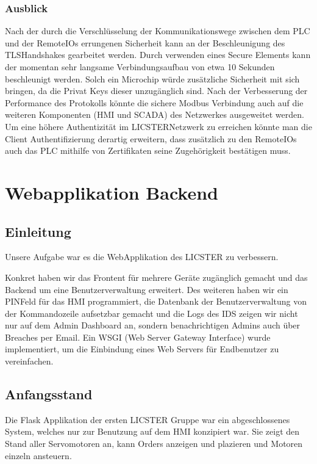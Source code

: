 \documentclass[letterpaper,10pt,ngerman]{sphinxmanual}
\begin{document}
\subsubsection{Ausblick}
\label{\detokenize{seccom:ausblick}}
Nach der durch die Verschlüsselung der Kommunikationswege zwischen dem PLC und der Remote\sphinxhyphen{}IOs errungenen Sicherheit kann an der Beschleunigung des TLS\sphinxhyphen{}Handshakes gearbeitet werden. Durch verwenden eines Secure Elements kann der momentan sehr langsame Verbindungsaufbau von etwa 10 Sekunden beschleunigt werden. Solch ein Microchip würde zusätzliche Sicherheit mit sich bringen, da die Privat Keys dieser unzugänglich sind. Nach der Verbesserung der Performance des Protokolls könnte die sichere Modbus Verbindung auch auf die weiteren Komponenten (HMI und SCADA) des Netzwerkes ausgeweitet werden. Um eine höhere Authentizität im LICSTER\sphinxhyphen{}Netzwerk zu erreichen könnte man die Client Authentifizierung derartig erweitern, dass zusätzlich zu den Remote\sphinxhyphen{}IOs auch das PLC mithilfe von Zertifikaten seine Zugehörigkeit bestätigen muss.


\section{Webapplikation Backend}
\label{\detokenize{webapp:webapplikation-backend}}\label{\detokenize{webapp::doc}}

\subsection{Einleitung}
\label{\detokenize{webapp:einleitung}}
Unsere Aufgabe war es die Web\sphinxhyphen{}Applikation des LICSTER zu verbessern.

Konkret haben wir das Frontent für mehrere Geräte zugänglich gemacht und das Backend um eine Benutzerverwaltung erweitert. Des weiteren haben wir ein PIN\sphinxhyphen{}Feld für das HMI programmiert, die Datenbank der Benutzerverwaltung von der Kommandozeile aufsetzbar gemacht und die Logs des IDS zeigen wir nicht nur auf dem Admin Dashboard an, sondern benachrichtigen Admins auch über Breaches per Email. Ein WSGI (Web Server Gateway Interface) wurde implementiert, um die Einbindung eines Web Servers für Endbenutzer zu vereinfachen.


\subsection{Anfangsstand}
\label{\detokenize{webapp:anfangsstand}}
Die Flask Applikation der ersten LICSTER Gruppe war ein abgeschlossenes System, welches nur zur Benutzung auf dem HMI konzipiert war. Sie zeigt den Stand aller Servomotoren an, kann Orders anzeigen und plazieren und Motoren einzeln ansteuern.
\end{document}
